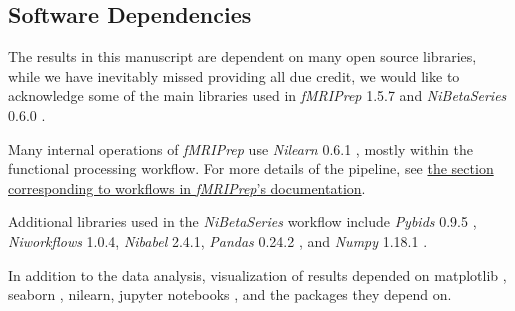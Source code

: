 \documentclass[10pt,letterpaper]{article}
\begin{document}
\subsection*{Software Dependencies}
\label{methods:software-dependencies}

The results in this manuscript are dependent on many open source
libraries, while we have inevitably missed providing all due credit,
we would like to acknowledge some of the main libraries used in 
\emph{fMRIPrep} 1.5.7 \cite{fmriprep1} and \emph{NiBetaSeries} 0.6.0 \cite{Kent2018}.

Many internal operations of \emph{fMRIPrep} use \emph{Nilearn} 0.6.1
\cite[RRID:SCR\_001362]{nilearn}, mostly within the functional
processing workflow. For more details of the pipeline, see
\href{https://fmriprep.readthedocs.io/en/latest/workflows.html}{the
section corresponding to workflows in \emph{fMRIPrep}'s documentation}.

Additional libraries used in the \emph{NiBetaSeries} workflow include
\emph{Pybids} 0.9.5 \cite{Yarkoni2019}, \emph{Niworkflows} 1.0.4,
\emph{Nibabel} 2.4.1, \emph{Pandas} 0.24.2 \cite{McKinney2010}, and
\emph{Numpy} 1.18.1 \cite{VanDerWalt2011, Oliphant2006}.

In addition to the data analysis, visualization of results depended
on matplotlib \cite{Hunter2007}, seaborn \cite{Waskom2020}, nilearn,
jupyter notebooks \cite{Kluyver2016a}, and the packages they depend on.


\end{document}
